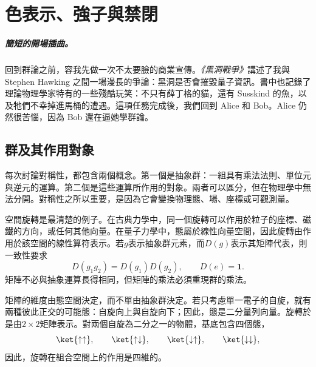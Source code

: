 \chapter{色表示、強子與禁閉}

\paragraph{簡短的開場插曲。}
回到群論之前，容我先做一次不太要臉的商業宣傳。\emph{《黑洞戰爭》}講述了我與 Stephen Hawking 之間一場漫長的爭論：黑洞是否會摧毀量子資訊。書中也記錄了理論物理學家特有的一些殘酷玩笑：不只有薛丁格的貓，還有 Susskind 的魚，以及牠們不幸掉進馬桶的遭遇。這項任務完成後，我們回到 Alice 和 Bob。Alice 仍然很苦惱，因為 Bob 還在逼她學群論。


\section{群及其作用對象}

每次討論對稱性，都包含兩個概念。第一個是抽象群：一組具有乘法法則、單位元與逆元的運算。第二個是這些運算所作用的對象。兩者可以區分，但在物理學中無法分開。對稱性之所以重要，是因為它會變換物理態、場、座標或可觀測量。

\begin{classroomqa}
\end{classroomqa}

空間旋轉是最清楚的例子。在古典力學中，同一個旋轉可以作用於粒子的座標、磁鐵的方向，或任何其他向量。在量子力學中，態屬於線性向量空間，因此旋轉由作用於該空間的線性算符表示。若\(g\)表示抽象群元素，而\(D(g)\)表示其矩陣代表，則一致性要求
\begin{equation}
D(g_1g_2)=D(g_1)D(g_2),
\qquad
D(e)=\boldsymbol 1.
\end{equation}
矩陣不必與抽象運算長得相同，但矩陣的乘法必須重現群的乘法。

矩陣的維度由態空間決定，而不單由抽象群決定。若只考慮單一電子的自旋，就有兩種彼此正交的可能態：自旋向上與自旋向下；因此，態是二分量列向量。旋轉於是由\(2\times2\)矩陣表示。對兩個自旋為二分之一的物體，基底包含四個態，
\begin{equation}
\ket{\uparrow\uparrow},\qquad
\ket{\uparrow\downarrow},\qquad
\ket{\downarrow\uparrow},\qquad
\ket{\downarrow\downarrow},
\end{equation}
因此，旋轉在組合空間上的作用是四維的。

